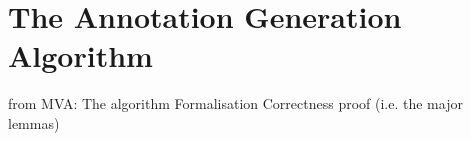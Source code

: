 \section{The Annotation Generation Algorithm}\label{SecAnnotGen}

from MVA:
The algorithm
Formalisation
Correctness proof (i.e. the major lemmas)

